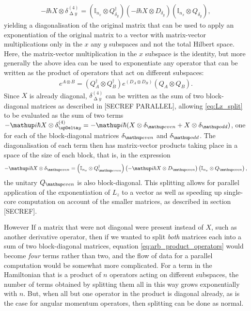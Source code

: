 \begin{enumerate}
    \begin{align}\label{eq:Lz_split}
        -\ii\hbar X \otimes \delta^{(4)}_{\upDelta y}
        = \left(\mathbb{I}_{n_x} \otimes Q_{\delta_y}^\dagger\right)
        \left(-\ii\hbar X \otimes  D_{\delta_y}\right)
        \left(\mathbb{I}_{n_x} \otimes Q_{\delta_y}\right),
    \end{align}
yielding a diagonalisation of the original matrix that can be used to apply an exponentiation of the original matrix to a vector with matrix-vector multiplications only in the $x$ any $y$ subspaces and not the total Hilbert space. Here, the matrix-vector multiplication in the $x$ subspace is the identity, but more generally the above idea can be used to exponentiate any operator that can be written as the product of operators that act on different subspaces:
\begin{align}\label{eq:arb_product_operators}
e^{A \otimes B} =
\left(Q^\dagger_A \otimes Q^\dagger_B\right)
e^{\left(D_A \otimes D_B\right)}
\left(Q_A \otimes Q_B\right).
\end{align}
Since $X$ is already diagonal, $\delta^{(4)}_{\upDelta y}$ can be written as the sum of two block-diagonal matrices as described in [SECREF PARALLEL], allowing \eqref{eq:Lz_split} to be evaluated as the sum of two terms $-\ii\hbar X \otimes \delta^{(4)}_{\upDelta y} = -\ii\hbar (X \otimes \delta_\up{even} + X \otimes \delta_\up{odd})$, one for each of the block-diagonal matrices $\delta_\up{even}$ and $\delta_\up{odd}$. The diagonalisation of each term then has matrix-vector products taking place in a space of the size of each block, that is, in the expression
\begin{align}
-\ii\hbar X \otimes \delta_\up{even} = \left(\mathbb{I}_{n_x} \otimes Q_\up{even}^\dagger\right)
        \left(-\ii\hbar X \otimes  D_\up{even}\right)
        \left(\mathbb{I}_{n_x} \otimes Q_\up{even}\right),
\end{align}
the unitary $Q_\up{even}$ is also block-diagonal. This splitting allows for parallel application of the exponentiation of $L_z$ to a vector as well as speeding up single-core computation on account of the smaller matrices, as described in section [SECREF].

However If a matrix that were not diagonal were present instead of $X$, such as another derivative operator, then if we wanted to split \emph{both} matrices each into a sum of two block-diagonal matrices, equation \eqref{eq:arb_product_operators} would become \emph{four} terms rather than two, and the flow of data for a parallel computation would be somewhat more complicated. For a term in the Hamiltonian that is a product of $n$ operators acting on different subspaces, the number of terms obtained by splitting them all in this way grows exponentially with $n$. But, when all but one operator in the product is diagonal already, as is the case for angular momentum operators, then splitting can be done as normal.

\end{enumerate}

